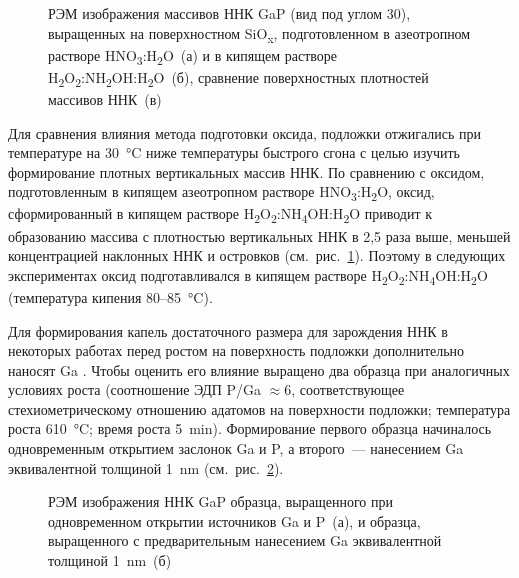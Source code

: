 \begin{figure}[ht]  \caption{РЭМ
				изображения массивов ННК GaP (вид под углом 30{\textdegree}),
				выращенных на поверхностном SiO\textsubscript{x}, подготовленном в
				азеотропном растворе HNO\textsubscript{3}:H\textsubscript{2}O~(а) и в
				кипящем растворе
				H\textsubscript{2}O\textsubscript{2}:NH\textsubscript{2}OH:H\textsubscript{2}O~(б),
		сравнение поверхностных плотностей массивов ННК~(в)}\label{fig:Image_39}
	\end{figure}

Для сравнения влияния метода подготовки оксида, подложки отжигались при
температуре на 30~\si{\degreeCelsius} ниже температуры быстрого сгона с целью
изучить формирование плотных вертикальных массив ННК. По сравнению с оксидом,
подготовленным в кипящем азеотропном растворе
HNO\textsubscript{3}:H\textsubscript{2}O, оксид, сформированный в кипящем
растворе
H\textsubscript{2}O\textsubscript{2}:NH\textsubscript{4}OH:H\textsubscript{2}O
приводит к образованию массива с плотностью вертикальных ННК в 2,5 раза выше,
меньшей концентрацией наклонных ННК и островков (см.~рис.~\cref{fig:Image_39}).
Поэтому в следующих экспериментах оксид подготавливался в кипящем растворе
H\textsubscript{2}O\textsubscript{2}:NH\textsubscript{4}OH:H\textsubscript{2}O
(температура кипения 80--85~\si{\degreeCelsius}).

Для формирования капель достаточного размера для зарождения ННК в некоторых
работах перед ростом на поверхность подложки дополнительно наносят Ga
\cite{Plissard2010}. Чтобы оценить его влияние выращено два образца при
аналогичных условиях роста (соотношение ЭДП P/Ga \(\approx 6\), соответствующее
стехиометрическому отношению адатомов на поверхности подложки; температура
роста 610~\si{\degreeCelsius}; время роста 5~\si{\minute}). Формирование
первого образца начиналось одновременным открытием заслонок Ga и P, а
второго~--- нанесением Ga эквивалентной толщиной 1~\si{\nano\meter}
(см.~рис.~\cref{fig:Image_40}).

\begin{figure}[ht]  \caption{РЭМ
			изображения ННК GaP образца, выращенного при одновременном открытии
			источников Ga и P~(а), и образца, выращенного с предварительным
			нанесением Ga эквивалентной толщиной
	1~{\si{\nano\metre}}~(б)}\label{fig:Image_40} \end{figure}

